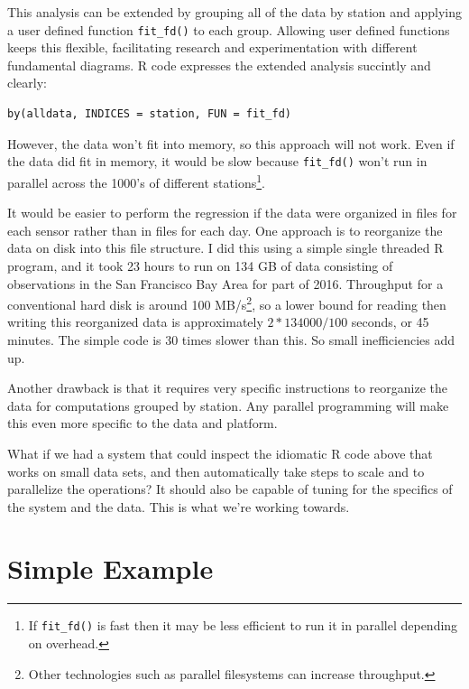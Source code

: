 \documentclass[12pt]{article}
\begin{document}
This analysis can be extended by grouping all of the data by station and
applying a user defined function \texttt{fit\_fd()} to each
group.
Allowing user defined functions keeps this flexible, facilitating research
and experimentation with different fundamental diagrams. R code expresses
the extended analysis succintly and clearly:

\begin{verbatim}
by(alldata, INDICES = station, FUN = fit_fd)
\end{verbatim}

However, the data won't fit into memory, so this approach will not work.
Even if the data did fit in memory, it would be slow because \texttt{fit\_fd()} won't
run in parallel across the 1000's of different stations\footnote{If 
\texttt{fit\_fd()} is fast then it may be less efficient to run it
in parallel depending on overhead.}.

It would be easier to perform the regression if the data were
organized in files for each sensor rather than in files for each day.  One
approach is to reorganize the data on disk into this file structure. I
did this using a simple single threaded R program, and it took 23 hours to
run on 134 GB of data consisting of observations in the San Francisco Bay
Area for part of 2016.  Throughput for a conventional hard disk is around
100 MB/s\footnote{Other technologies such as parallel filesystems can
increase throughput.}, so a lower bound for reading then writing this
reorganized data is approximately $2 * 134000 / 100$ seconds, or 45
minutes. The simple code is 30 times slower than this. So small
inefficiencies add up.

Another drawback is that it requires very specific instructions to
reorganize the data for computations grouped by station. Any parallel
programming will make this even more specific to the data and platform. 

What if we had a system that could inspect the idiomatic R code above that
works on small data sets, and then automatically take steps to scale and to
parallelize the operations? It should also be capable of tuning for the
specifics of the system and the data. This is what we're working towards.

\section{Simple Example}

\end{document}
